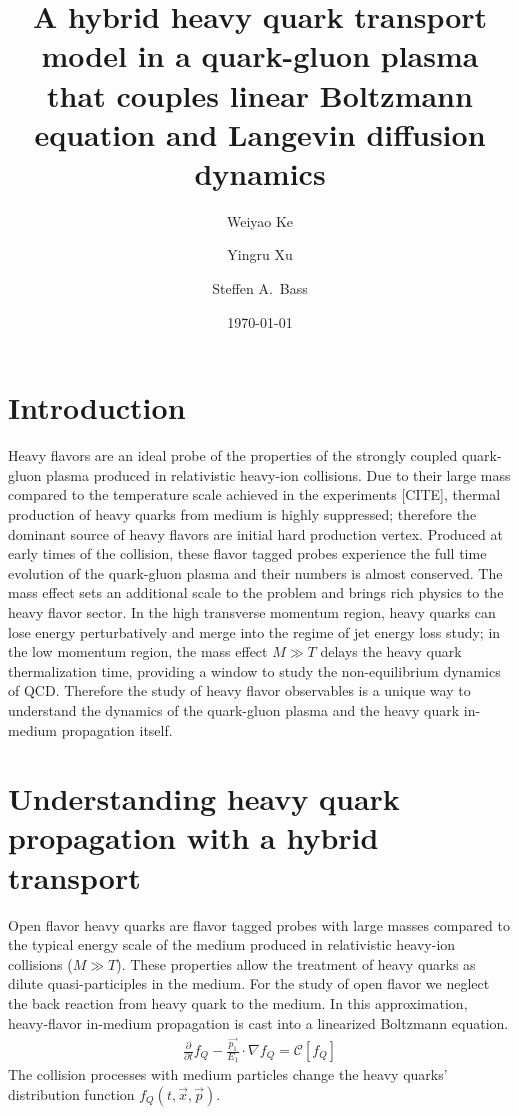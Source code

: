 \documentclass[aps, prc, reprint, amsmath, groupedaddress, nofootinbib]{revtex4-1}
\begin{document}
\title{A hybrid heavy quark transport model in a quark-gluon plasma that couples linear Boltzmann equation and Langevin diffusion dynamics}
\author{Weiyao Ke}
\author{Yingru Xu}
\author{Steffen A.\ Bass}
\date{\today}
\maketitle

\section{Introduction}
Heavy flavors are an ideal probe of the properties of the strongly coupled  quark-gluon plasma produced in relativistic heavy-ion collisions.
Due to their large mass compared to the temperature scale achieved in the experiments [CITE], thermal production of heavy quarks from medium is highly suppressed; therefore the dominant source of heavy flavors are initial hard production vertex.
Produced at early times of the collision, these flavor tagged probes experience the full time evolution of the quark-gluon plasma and their numbers is almost conserved.
The mass effect sets an additional scale to the problem and brings rich physics to the heavy flavor sector.
In the high transverse momentum region, heavy quarks can lose energy perturbatively and merge into the regime of jet energy loss study;
in the low momentum region, the mass effect $M\gg T$ delays the heavy quark thermalization time, providing a window to study the non-equilibrium dynamics of QCD.
Therefore the study of heavy flavor observables is a unique way to understand the dynamics of the quark-gluon plasma and the heavy quark in-medium propagation itself.


\section{Understanding heavy quark propagation with a hybrid transport}
Open flavor heavy quarks are flavor tagged probes with large masses compared to the typical energy scale of the medium produced in relativistic heavy-ion collisions ($M \gg T$).
These properties allow the treatment of heavy quarks as dilute quasi-participles in the medium.
For the study of open flavor we neglect the back reaction from heavy quark to the medium. 
In this approximation, heavy-flavor in-medium propagation is cast into a linearized Boltzmann equation.
\begin{eqnarray}
  \frac{\partial}{\partial t}f_Q - \frac{\vec{p_1}}{E_1}\cdot\nabla f_Q  = 
\mathcal{C}[f_Q]
\end{eqnarray}
The collision processes with medium particles change the heavy quarks' distribution function $f_Q(t, \vec{x}, \vec{p})$.
\end{document}
